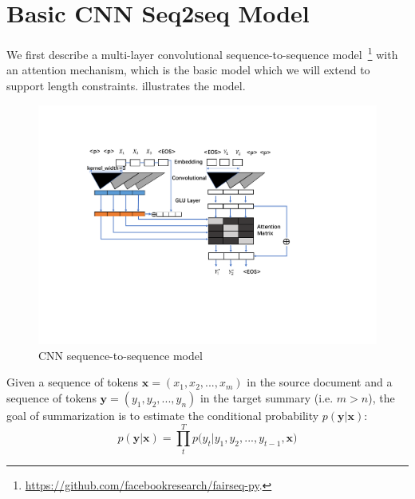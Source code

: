 \section{Basic CNN Seq2seq Model}
\label{sec:model}

We first describe a multi-layer convolutional sequence-to-sequence model~\footnote{\url{https://github.com/facebookresearch/fairseq-py}.} \cite{gehring2017convs2s,CunBDHHHJ89}
with an attention mechanism, which is the basic model which we will extend to support
length constraints.  illustrates the model.

\begin{figure}[th!]
\centering
\includegraphics[width=1.0\columnwidth]{figure/cmodel}
\caption{CNN sequence-to-sequence model} \label{fig:cnn}
\end{figure}

Given a sequence of tokens $\textbf{x} = (x_{1},x_{2},...,x_{m})$ in the
source document and a sequence of tokens
$\textbf{y} = (y_{1}, y_{2},..., y_{n})$ in the target summary (i.e. $m>n$),
the goal of summarization is to estimate the conditional probability
$p(\textbf{y}|\textbf{x})$:
\begin{equation}
p(\textbf{y} | \textbf{x}) \!=\! {\prod^T_{t} {p(y_{t} | y_{1}, y_{2},..., y_{t-1}, \textbf{x}})}
\end{equation}

